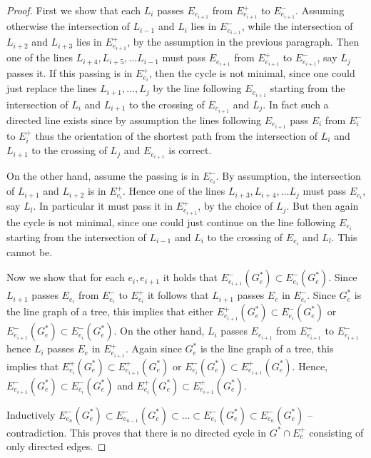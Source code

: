 \documentclass[final,11pt]{article}
\begin{document}
\begin{proof}
First we show that each $L_i$ passes $E_{e_{i+1}}$ from $E_{e_{i+1}}^+$ to $E_{e_{i+1}}^-$. Assuming otherwise the intersection of $L_{i-1}$ and $L_{i}$ lies in $E_{e_{i+1}}^-$, while the intersection of $L_{i+2}$ and $L_{i+3}$  lies in $E_{e_{i+1}}^+$, by the assumption in the previous paragraph. Then one of the lines $L_{i+4},L_{i+5}, \ldots L_{i-1}$ must pass $E_{e_{i+1}}$ from $E_{e_{i+1}}^+$ to $E_{e_{i+1}}^-$, say $L_j$ passes it. If this passing is in $E_{e_{i}}^+$, then the cycle is not minimal, since one could just replace the lines $L_{i+1},\ldots, L_j$ by the line following $E_{e_{i+1}}$ starting from the intersection of $L_{i}$ and $L_{i+1}$ to the crossing of $E_{e_{i+1}}$ and $L_j$.
In fact such a directed line exists since by assumption the lines following $E_{e_{i+1}}$ pass $E_{i}$ from $E_i^-$ to $E_i^+$ thus the orientation of the shortest path from the intersection of $L_{i}$ and $L_{i+1}$  to the crossing of $L_{j}$ and $E_{e_{i+1}}$ is correct. 

On the other hand, assume the passing is in $E_{e_{i}}^-$. By assumption, the intersection of $L_{i+1}$ and $L_{i+2}$ is in $E_{e_{i}}^+$. Hence one of the lines $L_{i+3},L_{i+4}, \ldots L_{j}$ must pass $E_{e_{i}}$, say $L_{l}$. In particular it must pass it in $E_{e_{i+1}}^+$, by the choice of $L_j$. But then again the cycle is not minimal, since one could just continue on the line following $E_{e_{i}}$ starting from the intersection of $L_{i-1}$ and $L_{i}$ to the crossing of $E_{e_{i}}$ and $L_{l}$. This cannot be.


Now we show that for each $e_i, e_{i+1}$ it holds that $E_{e_{i+1}}^-(G_e^*)  \subset E_{e_{i}}^-(G_e^*)$. Since $L_{i+1}$ passes $E_{e_i}$ from $E_{e_i}^-$ to $E_{e_i}^+$ it follows that $L_{i+1}$ passes $E_e$ in $E_{e_i}^-$. Since $G_e^*$ is the line graph of a tree, this implies that either $E_{e_{i+1}}^+(G_e^*)  \subset E_{e_{i}}^-(G_e^*)$ or $E_{e_{i+1}}^-(G_e^*)  \subset E_{e_{i}}^-(G_e^*)$. On the other hand, $L_{i}$ passes $E_{e_{i+1}}$ from $E_{e_{i+1}}^+$ to 
$E_{e_{i+1}}^-$ hence $L_{i}$ passes $E_e$ in $E_{e_{i+1}}^+$. Again since $G_e^*$ is the line graph of a tree, this implies that $E_{e_{i}}^+(G_e^*)  \subset E_{e_{i+1}}^+(G_e^*)$ or $E_{e_{i}}^-(G_e^*)  \subset E_{e_{i+1}}^+(G_e^*)$. Hence, $E_{e_{i+1}}^-(G_e^*)  \subset E_{e_{i}}^-(G_e^*)$ and $E_{e_{i}}^+(G_e^*)  \subset E_{e_{i + 1}}^+(G_e^*)$.

Inductively 
$E_{e_{n}}^-(G_e^*)  \subset E_{e_{n-1}}^-(G_e^*) \subset \dots \subset E_{e_{1}}^-(G_e^*) \subset E_{e_{n}}^-(G_e^*)$ -- contradiction. This proves that there is no directed cycle in $G^* \cap E_e^+$ consisting of only directed edges.


\end{proof}
\end{document}
